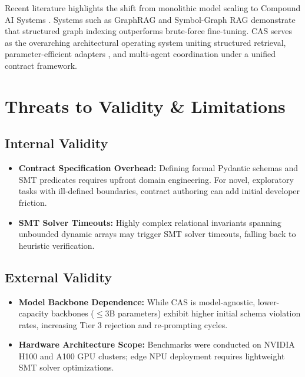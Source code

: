 \documentclass[10pt,journal,compsoc,twocolumn]{IEEEtran}
\begin{document}
Recent literature highlights the shift from monolithic model scaling to Compound AI Systems \cite{arxiv_2406_00584,arxiv_2005_14165}. Systems such as GraphRAG \cite{arxiv_2501_14050} and Symbol-Graph RAG demonstrate that structured graph indexing outperforms brute-force fine-tuning. CAS serves as the overarching architectural operating system uniting structured retrieval, parameter-efficient adapters \cite{arxiv_2305_18290}, and multi-agent coordination under a unified contract framework.




\section{Threats to Validity \& Limitations}



\subsection{Internal Validity}

\begin{itemize}
  \item \textbf{Contract Specification Overhead:} Defining formal Pydantic schemas and SMT predicates requires upfront domain engineering. For novel, exploratory tasks with ill-defined boundaries, contract authoring can add initial developer friction.
  \item \textbf{SMT Solver Timeouts:} Highly complex relational invariants spanning unbounded dynamic arrays may trigger SMT solver timeouts, falling back to heuristic verification.
\end{itemize}


\subsection{External Validity}

\begin{itemize}
  \item \textbf{Model Backbone Dependence:} While CAS is model-agnostic, lower-capacity backbones ($\le 3$B parameters) exhibit higher initial schema violation rates, increasing Tier 3 rejection and re-prompting cycles.
  \item \textbf{Hardware Architecture Scope:} Benchmarks were conducted on NVIDIA H100 and A100 GPU clusters; edge NPU deployment requires lightweight SMT solver optimizations.
\end{itemize}
\end{document}
